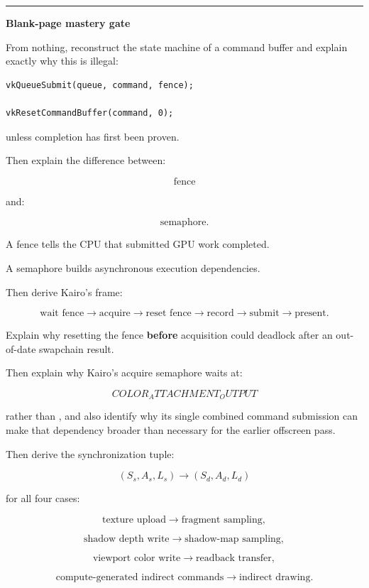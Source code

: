 \begin{center}\rule{0.5\linewidth}{0.5pt}\end{center}

\textbf{Blank-page mastery gate}

From nothing, reconstruct the state machine of a command buffer and explain exactly why this is illegal:

\begin{verbatim}
vkQueueSubmit(queue, command, fence);

vkResetCommandBuffer(command, 0);
\end{verbatim}

unless completion has first been proven.

Then explain the difference between:

\[
\boxed{\text{fence}}
\]

and:

\[
\boxed{\text{semaphore}}.
\]

A fence tells the CPU that submitted GPU work completed.

A semaphore builds asynchronous execution dependencies.

Then derive Kairo's frame:

\[
\text{wait fence}
\rightarrow
\text{acquire}
\rightarrow
\text{reset fence}
\rightarrow
\text{record}
\rightarrow
\text{submit}
\rightarrow
\text{present}.
\]

Explain why resetting the fence \textbf{before} acquisition could deadlock after an out-of-date swapchain result.

Then explain why Kairo's acquire semaphore waits at:

\[
COLOR_ATTACHMENT_OUTPUT
\]

rather than , and also identify why its single combined command submission can make that dependency broader than necessary for the earlier offscreen pass.

Then derive the synchronization tuple:

\[
\boxed{
(S_s,A_s,L_s)
\rightarrow
(S_d,A_d,L_d)
}
\]

for all four cases:

\[
\text{texture upload}
\rightarrow
\text{fragment sampling},
\]

\[
\text{shadow depth write}
\rightarrow
\text{shadow-map sampling},
\]

\[
\text{viewport color write}
\rightarrow
\text{readback transfer},
\]

\[
\text{compute-generated indirect commands}
\rightarrow
\text{indirect drawing}.
\]

